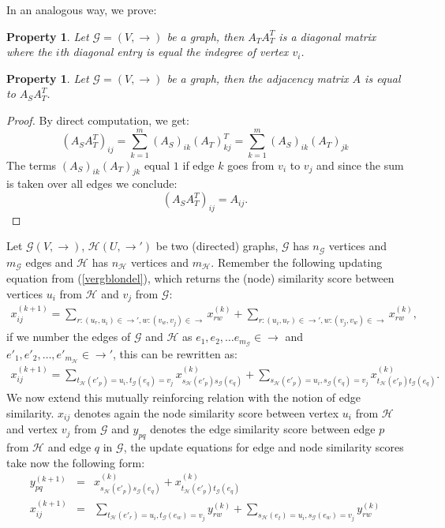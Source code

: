 \documentclass[a4paper,11pt]{report}
\newtheorem{property}[theorem]{Property}
\newcommand{\graf}{\mathscr{G}}
\newcommand{\grafeen}{\mathscr{H}}
\begin{document}
In an analogous way, we prove:
\begin{property}\label{indegreeprop}
Let $\graf=(V,\to)$ be a graph, then $A_TA_T^T$ is a diagonal matrix where the $i$th diagonal entry is equal the indegree of vertex $v_i$.
   \end{property}

\begin{property}\label{adjacencyprop}
  Let $\graf =(V,\to)$ be a graph, then the adjacency matrix $A$ is equal to 
  $A_SA^T_T$.
\end{property}
\begin{proof}
  By direct computation, we get:
  $$(A_SA_T^T)_{ij} = \sum^m_{k=1}(A_S)_{ik}(A_T)^T_{kj} = \sum^m_{k=1}(A_S)_{ik}(A_T)_{jk}$$
The terms $(A_S)_{ik}(A_T)_{jk}$ equal $1$ if edge $k$ goes from $v_i$ to 
$v_j$ and since the sum is taken over all edges we conclude:
$$(A_SA_T^T)_{ij} = A_{ij}.$$
\end{proof}
Let  $\graf(V,\to)$, $\grafeen(U,\to')$ be two (directed) graphs, $\graf$ has $n_\graf$ vertices and $m_\graf$ edges and $\grafeen$ has $n_\grafeen$ vertices and $m_\grafeen$. 
Remember the following updating equation from (\ref{vergblondel}), which returns the 
(node) similarity score between vertices $u_i$ 
from $\grafeen$ and $v_j$ from $\graf$:
\begin{eqnarray*}
 x^{(k+1)}_{ij} = \sum_{r:(u_r,u_i)\in \to', w:(v_w,v_j) \in \to} x^{(k)}_{rw} +  \sum_{r:(u_i,u_r)\in \to', w:(v_j,v_w) \in \to} 
 x^{(k)}_{rw},
 \end{eqnarray*} 
if we number the edges of $\graf$ and $\grafeen$ as  $e_1, e_2, \ldots e_{m_\graf}  \in \to$ and $e'_1, e'_2, \ldots, e'_{m_\grafeen}  \in \to'$, this can be rewritten as:
 \begin{eqnarray*}
 x^{(k+1)}_{ij} = \sum_{t_\grafeen(e'_p)=u_i, t_\graf(e_q)=v_j} x^{(k)}_{s_\grafeen(e'_p)s_\graf(e_q)} +  \sum_{s_\grafeen(e'_p)=u_i, s_\graf(e_q)=v_j} 
 x^{(k)}_{t_\grafeen(e'_p)t_\graf(e_q)}.
 \end{eqnarray*} 
 We now extend this mutually reinforcing relation with the notion of edge 
 similarity. $x_{ij}$ denotes again the node similarity score between vertex $u_i$ from $\grafeen$ and vertex $v_j$ from $\graf$ 
 and $y_{pq}$ denotes the edge similarity score between edge $p$ from $\grafeen$ and edge $q$ in $\graf$, the update equations for edge and node similarity scores take now the 
 following form:
 \begin{eqnarray}
 y_{pq}^{(k+1)} &=& x^{(k)}_{s_\grafeen(e'_p)s_\graf(e_q)} + x^{(k)}_{t_\grafeen(e'_p)t_\graf(e_q)}\label{edge1}\\
 x^{(k+1)}_{ij} &=& \sum_{t_\grafeen(e'_r)=u_i, t_\graf(e_w)=v_j} y^{(k)}_{rw} +  \sum_{s_\grafeen(e_t)=u_i, s_\graf(e_w)=v_j} y^{(k)}_{rw} \label{edge2}
 \end{eqnarray} 
\end{document}
